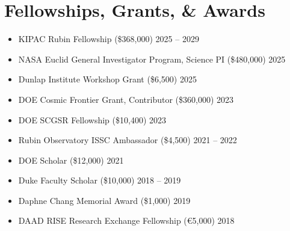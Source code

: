 \section{Fellowships, Grants, \& Awards}
\begin{itemize}
    \item KIPAC Rubin Fellowship (\$368,000) \hfill 2025 -- 2029
    \item NASA Euclid General Investigator Program, Science PI (\$480,000) \hfill 2025
    \item Dunlap Institute Workshop Grant (\$6,500) \hfill 2025
    \item DOE Cosmic Frontier Grant, Contributor (\$360,000) \hfill 2023
    \item DOE SCGSR Fellowship (\$10,400) \hfill 2023
    \item Rubin Observatory ISSC Ambassador (\$4,500) \hfill 2021 -- 2022
    \item DOE Scholar (\$12,000) \hfill 2021
    \item Duke Faculty Scholar (\$10,000) \hfill 2018 -- 2019
    \item Daphne Chang Memorial Award (\$1,000) \hfill 2019
    \item DAAD RISE Research Exchange Fellowship (\euro{5,000}) \hfill 2018
\end{itemize}